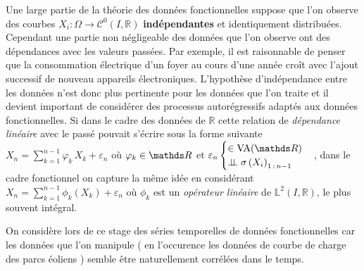 Une large partie de la théorie des données fonctionnelles suppose que l'on observe des courbes $X_i : \Omega \rightarrow \mathcal C^0(I, \mathds R)$ \textbf{indépendantes} et identiquement distribuées. Cependant une partie non négligeable des données que l'on observe ont des dépendances avec les valeurs passées. Par exemple, il est raisonnable de penser que la consommation électrique d'un foyer au cours d'une année croît avec l'ajout successif de nouveau appareils électroniques. L'hypothèse d'indépendance entre les données n'est donc plus pertinente pour les données que l'on traite et il devient important de considérer des processus autorégressifs adaptés aux données fonctionnelles. 
Si dans le cadre des données de $\mathds R$ cette relation de \emph{dépendance linéaire} avec le passé pouvait s'écrire sous la forme suivante 
$X_n = \sum\limits_{k=1}^{n-1} \varphi_k \, X_k + \varepsilon_n$ où $\varphi_k \in \grandR$ 
et 
$\varepsilon_n \begin{cases} \in \operatorname{VA}(\grandR) \\ \indep \sigma\left( X_i \right)_{1\,: \, n-1}\end{cases}$, 
dans le cadre fonctionnel on capture la même idée en considérant 
$X_n = \sum\limits_{k=1}^{n-1} \phi_k \left( X_k \right) + \varepsilon_n$ où $\phi_k$ 
est un \emph{opérateur linéaire} de $\mathds L^2(I, \mathds R)$, 
le plus souvent intégral. 


On considère lors de ce stage des séries temporelles de données fonctionnelles car les données que l'on manipule ( en l'occurence les données de courbe de charge des parcs éoliens ) semble être naturellement corrélées dans le temps. 

